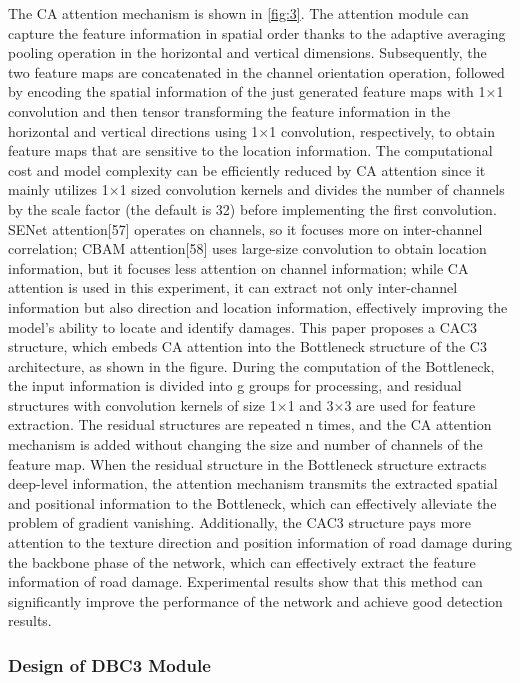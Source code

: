 \documentclass[sensors,article,submit,moreauthors]{Definitions/mdpi}
\begin{document}
    The CA attention mechanism is shown in \autoref{fig:3}. The attention module can capture the feature information in spatial order thanks to the adaptive averaging pooling operation in the horizontal and vertical dimensions. Subsequently, the two feature maps are concatenated in the channel orientation operation, followed by encoding the spatial information of the just generated feature maps with 1$\times$1 convolution and then tensor transforming the feature information in the horizontal and vertical directions using 1$\times$1 convolution, respectively, to obtain feature maps that are sensitive to the location information. The computational cost and model complexity can be efficiently reduced by CA attention since it mainly utilizes 1×1 sized convolution kernels and divides the number of channels by the scale factor (the default is 32) before implementing the first convolution.
    SENet attention[57]\citep{Hu_2018_CVPR} operates on channels, so it focuses more on inter-channel correlation; CBAM attention[58]\citep{Woo_2018_ECCV} uses large-size convolution to obtain location information, but it focuses less attention on channel information; while CA attention is used in this experiment, it can extract not only inter-channel information but also direction and location information, effectively improving the model's ability to locate and identify damages.
    This paper proposes a CAC3 structure, which embeds CA attention into the Bottleneck structure of the C3 architecture, as shown in the figure. During the computation of the Bottleneck, the input information is divided into g groups for processing, and residual structures with convolution kernels of size 1×1 and 3×3 are used for feature extraction. The residual structures are repeated n times, and the CA attention mechanism is added without changing the size and number of channels of the feature map. When the residual structure in the Bottleneck structure extracts deep-level information, the attention mechanism transmits the extracted spatial and positional information to the Bottleneck, which can effectively alleviate the problem of gradient vanishing. Additionally, the CAC3 structure pays more attention to the texture direction and position information of road damage during the backbone phase of the network, which can effectively extract the feature information of road damage. Experimental results show that this method can significantly improve the performance of the network and achieve good detection results.

    \subsubsection{Design of DBC3 Module}
\end{document}
